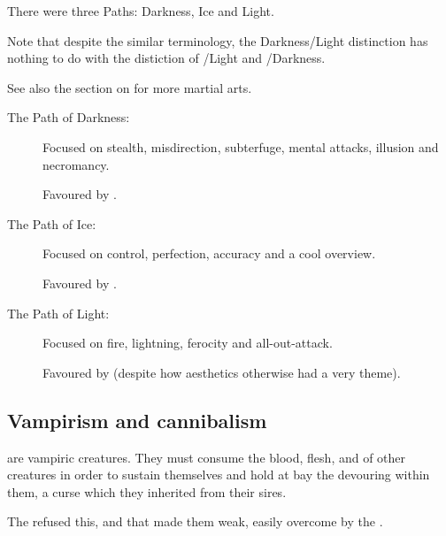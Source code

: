 There were three Paths: Darkness, Ice and Light. 

Note that despite the similar terminology, the Darkness/Light distinction has nothing to do with the distiction of \iquin/Light and \itzach/Darkness. 

See also the section on  for more martial arts. 


\begin{description}
  \item[The Path of Darkness:]
    Focused on stealth, misdirection, subterfuge, mental attacks, illusion and necromancy. 
    
    Favoured by \TiphredSerah. 
    
    
    
  \item[The Path of Ice:]
    Focused on control, perfection, accuracy and a cool overview. 
    
    Favoured by \CiriathSepher. 
    
    
    
  \item[The Path of Light:]
    Focused on fire, lightning, ferocity and all-out-attack. 
    
    Favoured by \Mystraacht{} (despite how \Mystraacht{} aesthetics otherwise had a very  theme).
\end{description}










\subsection{Vampirism and cannibalism}
\Resphain{} are vampiric creatures. They must consume the blood, flesh,  and  of other creatures in order to sustain themselves and hold at bay the devouring  within them, a curse which they inherited from their \SitraAchra sires.

The  refused this, and that made them weak, easily overcome by the . 

